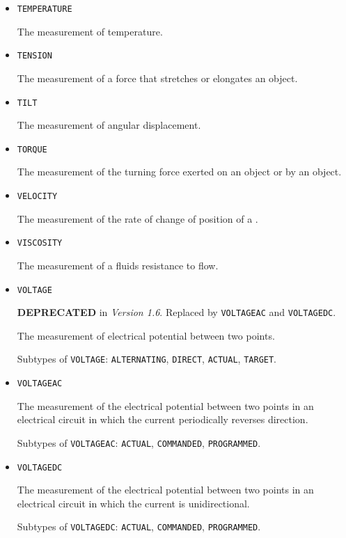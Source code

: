 \begin{itemize}
\item \texttt{TEMPERATURE}  

The measurement of temperature.


\item \texttt{TENSION}  

The measurement of a force that stretches or elongates an object.


\item \texttt{TILT}  

The measurement of angular displacement.


\item \texttt{TORQUE}  

The measurement of the turning force exerted on an object or by an object.


\item \texttt{VELOCITY}  

The measurement of the rate of change of position of a .


\item \texttt{VISCOSITY}  

The measurement of a fluids resistance to flow.


\item \texttt{VOLTAGE}  

\textbf{DEPRECATED} in \textit{Version 1.6}. Replaced by \texttt{VOLTAGE\textunderscore AC} and \texttt{VOLTAGE\textunderscore DC}.

The measurement of electrical potential between two points.

Subtypes of \texttt{VOLTAGE}: \texttt{ALTERNATING}, \texttt{DIRECT}, \texttt{ACTUAL}, \texttt{TARGET}.

\item \texttt{VOLTAGE\textunderscore AC}  

The measurement of the electrical potential between two points in an electrical circuit in which the current periodically reverses direction.

Subtypes of \texttt{VOLTAGE\textunderscore AC}: \texttt{ACTUAL}, \texttt{COMMANDED}, \texttt{PROGRAMMED}.

\item \texttt{VOLTAGE\textunderscore DC}  

The measurement of the electrical potential between two points in an electrical circuit in which the current is unidirectional.

Subtypes of \texttt{VOLTAGE\textunderscore DC}: \texttt{ACTUAL}, \texttt{COMMANDED}, \texttt{PROGRAMMED}.


\end{itemize}
